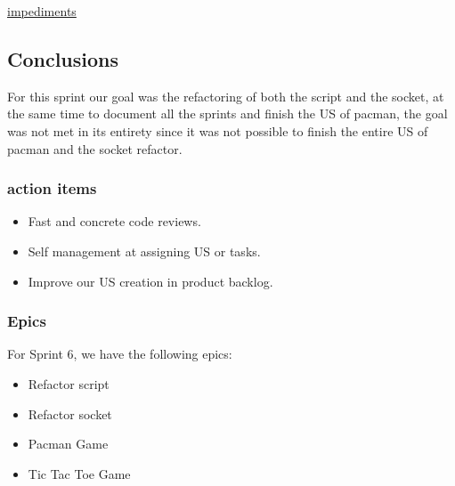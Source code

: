 \href{https://docs.google.com/spreadsheets/d/16zbS6L_JsIA9JhoJ1_e8Luk3MzKs8KApNbeizERjYn0/edit?usp=sharing}{impediments}

\subsection{Conclusions}
For this sprint our goal was the refactoring of both the script and the socket, at the same time to document all the sprints and finish the US of pacman, the goal was not met in its entirety since it was not possible to finish the entire US of pacman and the socket refactor. 

\subsubsection{action items}

\begin{itemize}
    \item Fast and concrete code reviews.
    \item Self management at assigning US or tasks.
    \item Improve our US creation in product backlog.
\end{itemize}


\subsubsection{Epics}

For Sprint 6, we have the following epics:

\begin{itemize}
    \item Refactor script
    \item Refactor socket
    \item Pacman Game
    \item Tic Tac Toe Game
\end{itemize}